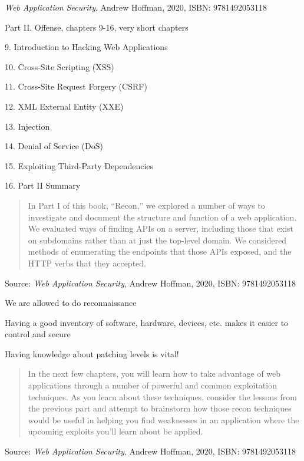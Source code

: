 \documentclass[Screen16to9,17pt]{foils}
\begin{document}
\emph{Web Application Security}, Andrew Hoffman, 2020, ISBN: 9781492053118
\begin{list1}
\item Part II. Offense, chapters 9-16, very short chapters
\item 9. Introduction to Hacking Web Applications
\item 10. Cross-Site Scripting (XSS)
\item 11. Cross-Site Request Forgery (CSRF)
\item 12. XML External Entity (XXE)
\item 13. Injection
\item 14. Denial of Service (DoS)
\item 15. Exploiting Third-Party Dependencies
\item 16. Part II Summary
\end{list1}



\begin{quote}
In Part I of this book, “Recon,” we explored a number of ways to investigate and
document the structure and function of a web application. We evaluated ways of
finding APIs on a server, including those that exist on subdomains rather than at just the
top-level domain. We considered methods of enumerating the endpoints that those
APIs exposed, and the HTTP verbs that they accepted.
\end{quote}
Source: \emph{Web Application Security}, Andrew Hoffman, 2020, ISBN: 9781492053118


\begin{list2}
\item We are allowed to do reconnaissance
\item Having a good inventory of software, hardware, devices, etc. makes it easier to control and secure
\item Having knowledge about patching levels is vital!
\end{list2}




\begin{quote}
  In the next few chapters, you will learn how to take advantage of web applications
  through a number of powerful and common exploitation techniques. As you learn
  about these techniques, consider the lessons from the previous part and attempt to
  brainstorm how those recon techniques would be useful in helping you find weaknesses in an application where the upcoming exploits you’ll learn about be applied.
\end{quote}
Source: \emph{Web Application Security}, Andrew Hoffman, 2020, ISBN: 9781492053118
\end{document}
